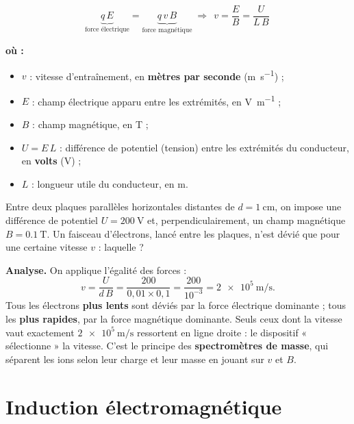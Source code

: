 \documentclass[11pt,a4paper]{article}
\newenvironment{ou}{%
  \par\smallskip\noindent\textbf{où :}\nopagebreak
  \begin{itemize}[leftmargin=1.8em,topsep=2pt,itemsep=1.5pt,parsep=0pt]}%
  {\end{itemize}}
\begin{document}
\begin{formule}[équilibre force électrique $=$ force magnétique]
\[ \underbrace{q\, E}_{\text{force électrique}} = \underbrace{q\, v\, B}_{\text{force magnétique}}
   \;\Longrightarrow\; \boxed{\,v = \dfrac{E}{B} = \dfrac{U}{L\, B}\,} \]
\begin{ou}
  \item $v$ : vitesse d'entraînement, en \textbf{mètres par seconde} (\si{\metre\per\second}) ;
  \item $E$ : champ électrique apparu entre les extrémités, en \si{\volt\per\metre} ;
  \item $B$ : champ magnétique, en \si{\tesla} ;
  \item $U=E\,L$ : différence de potentiel (tension) entre les extrémités du conducteur, en
        \textbf{volts} (\si{\volt}) ;
  \item $L$ : longueur utile du conducteur, en \si{\metre}.
\end{ou}
\end{formule}

\begin{exemple}
Entre deux plaques parallèles horizontales distantes de $d=\SI{1}{\centi\metre}$, on impose une
différence de potentiel $U=\SI{200}{\volt}$ et, perpendiculairement, un champ magnétique
$B=\SI{0.1}{\tesla}$. Un faisceau d'électrons, lancé entre les plaques, n'est dévié que pour une
certaine vitesse $v$ : laquelle ?

\smallskip
\textbf{Analyse.} On applique l'égalité des forces :
\[ v = \dfrac{U}{d\, B} = \dfrac{200}{0{,}01\times 0{,}1} = \dfrac{200}{10^{-3}} = \SI{2e5}{\metre\per\second}. \]
Tous les électrons \textbf{plus lents} sont déviés par la force électrique dominante ; tous les
\textbf{plus rapides}, par la force magnétique dominante. Seuls ceux dont la vitesse vaut exactement
$\SI{2e5}{\metre\per\second}$ ressortent en ligne droite : le dispositif « sélectionne » la vitesse.
C'est le principe des \textbf{spectromètres de masse}, qui séparent les ions selon leur charge et
leur masse en jouant sur $v$ et $B$.
\end{exemple}

\section{Induction électromagnétique}
\end{document}
